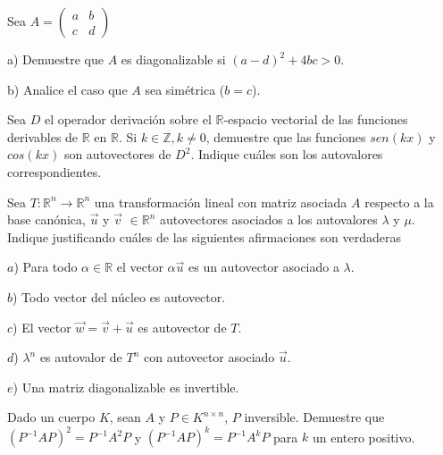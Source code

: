 \begin{exercise} 
\item
Sea 
$A=\left(\begin{array}{cc}a & b \\c & d
\end{array}
 \right)$

 \bigskip
 
 
\noindent a)  Demuestre que $A$ es diagonalizable si $(a-d)^2+4bc > 0$.

\bigskip

\noindent b)  Analice el caso que $A$ sea simétrica ($b=c$).

\end{exercise} 

\begin{exercise} 
\item
 Sea $D$ el operador derivación sobre el $\mathbb{R}$-espacio vectorial de las funciones derivables de $\mathbb{R}$ en $\mathbb{R}$. Si $k \in \mathbb{Z}, k \neq 0$, demuestre que las funciones $sen(kx)$ y $cos(kx)$ son autovectores de $D^2$. Indique cuáles son los autovalores correspondientes. 
 \end{exercise}  
 \begin{exercise} 
\item

Sea $T:\mathbb{R}^n \rightarrow \mathbb{R}^n$ una transformación lineal con matriz asociada $A$ respecto a la base canónica, $\vec{u}$ y $\vec{v}$  
$ \in \mathbb{R}^n$ autovectores asociados a los autovalores $\lambda$ y $\mu$.
Indique justificando cuáles de las siguientes afirmaciones son verdaderas

$a$) Para todo $\alpha \in \mathbb{R}$ el vector $\alpha \vec{u}$ es un autovector asociado
a $\lambda$.

$b$) Todo vector del núcleo es autovector.

$c$) El vector $\vec{w}=\vec{v}+\vec{u}$ es autovector de $T$.

$d$) $\lambda^n$ es autovalor de $T^n$ con autovector asociado $\vec{u}$.

$e$) Una matriz diagonalizable es invertible.

\end{exercise} 
\begin{exercise} 
\item
 
 Dado un cuerpo $K$, sean $A$ y $P \in K^{n \times n}$, $P$ inversible. Demuestre que $(P^{-1}AP)^2=P^{-1}A^2P$ y  $(P^{-1}AP)^k=P^{-1}A^kP$ para $k$ un entero positivo.
 
 \end{exercise} 

